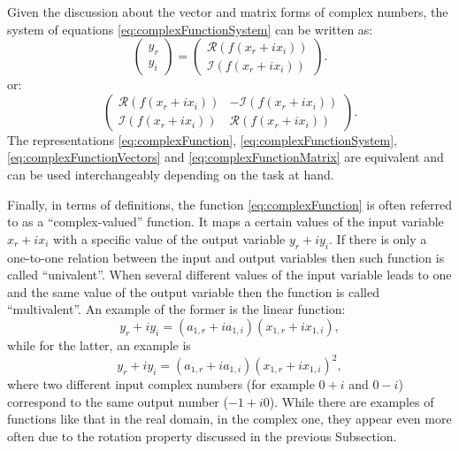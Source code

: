 \documentclass[
]{book}
\begin{document}
Given the discussion about the vector and matrix forms of complex numbers, the system of equations \eqref{eq:complexFunctionSystem} can be written as:
\begin{equation}
    \begin{pmatrix} y_r \\ y_i \end{pmatrix} =
    \begin{pmatrix} \mathcal{R}(f(x_r+ix_i)) \\ \mathcal{I}(f(x_r+ix_i)) \end{pmatrix} .
    \label{eq:complexFunctionVectors}
\end{equation}
or:
\begin{equation}
    \begin{pmatrix} \mathcal{R}(f(x_r+ix_i)) & - \mathcal{I}(f(x_r+ix_i)) \\ \mathcal{I}(f(x_r+ix_i)) & \mathcal{R}(f(x_r+ix_i)) \end{pmatrix} .
    \label{eq:complexFunctionMatrix}
\end{equation}
The representations \eqref{eq:complexFunction}, \eqref{eq:complexFunctionSystem}, \eqref{eq:complexFunctionVectors} and \eqref{eq:complexFunctionMatrix} are equivalent and can be used interchangeably depending on the task at hand.

Finally, in terms of definitions, the function \eqref{eq:complexFunction} is often referred to as a ``complex-valued'' function. It maps a certain values of the input variable \(x_r + i x_i\) with a specific value of the output variable \(y_r +i y_i\). If there is only a one-to-one relation between the input and output variables then such function is called ``univalent''. When several different values of the input variable leads to one and the same value of the output variable then the function is called ``multivalent''. An example of the former is the linear function:
\begin{equation*}
    y_r + i y_i = (a_{1,r} + i a_{1,i}) (x_{1,r} + i x_{1,i}),
\end{equation*}
while for the latter, an example is
\begin{equation*}
    y_r + i y_i = (a_{1,r} + i a_{1,i}) (x_{1,r} + i x_{1,i})^2, 
\end{equation*}
where two different input complex numbers (for example \(0 + i\) and \(0-i\)) correspond to the same output number (\(-1 + i0\)). While there are examples of functions like that in the real domain, in the complex one, they appear even more often due to the rotation property discussed in the previous Subsection.
\end{document}
